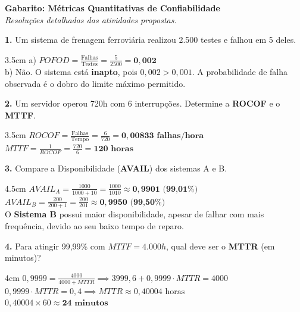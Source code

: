 \documentclass[12pt]{article}
\begin{document}
    
\begin{center}
  {\Large \textbf{Gabarito: Métricas Quantitativas de Confiabilidade}}\\[0.2cm]
  \textit{Resoluções detalhadas das atividades propostas.}
\end{center}

\vspace{0.4cm}

\textbf{1.} Um sistema de frenagem ferroviária realizou 2.500 testes e falhou em 5 deles.
\begin{resposta}{3.5cm}
    a) $POFOD = \frac{\text{Falhas}}{\text{Testes}} = \frac{5}{2500} = \mathbf{0,002}$ \\
    b) Não. O sistema está \textbf{inapto}, pois $0,002 > 0,001$. A probabilidade de falha observada é o dobro do limite máximo permitido.
\end{resposta}

\vspace{0.4cm}

\textbf{2.} Um servidor operou 720h com 6 interrupções. Determine a \textbf{ROCOF} e o \textbf{MTTF}.
\begin{resposta}{3.5cm}
    $ROCOF = \frac{\text{Falhas}}{\text{Tempo}} = \frac{6}{720} = \mathbf{0,00833 \text{ falhas/hora}}$ \\
    $MTTF = \frac{1}{ROCOF} = \frac{720}{6} = \mathbf{120 \text{ horas}}$
\end{resposta}

\vspace{0.4cm}

\textbf{3.} Compare a Disponibilidade (\textbf{AVAIL}) dos sistemas A e B.
\begin{resposta}{4.5cm}
    $AVAIL_A = \frac{1000}{1000 + 10} = \frac{1000}{1010} \approx \mathbf{0,9901 \text{ (99,01\%)}} $ \\
    $AVAIL_B = \frac{200}{200 + 1} = \frac{200}{201} \approx \mathbf{0,9950 \text{ (99,50\%)}} $ \\
    O \textbf{Sistema B} possui maior disponibilidade, apesar de falhar com mais frequência, devido ao seu baixo tempo de reparo.
\end{resposta}

\vspace{0.4cm}

\textbf{4.} Para atingir 99,99\% com $MTTF = 4.000h$, qual deve ser o \textbf{MTTR} (em minutos)?
\begin{resposta}{4cm}
    $0,9999 = \frac{4000}{4000 + MTTR} \implies 3999,6 + 0,9999 \cdot MTTR = 4000$ \\
    $0,9999 \cdot MTTR = 0,4 \implies MTTR \approx 0,40004 \text{ horas}$ \\
    $0,40004 \times 60 \approx \mathbf{24 \text{ minutos}}$
\end{resposta}
\end{document}
